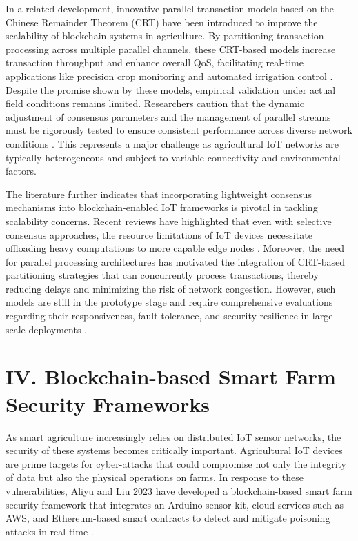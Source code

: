 \documentclass[12pt,onecolumn]{IEEEtran} %
\begin{document}
In a related development, innovative parallel transaction models based on the Chinese Remainder Theorem (CRT) have been introduced to improve the scalability of blockchain systems in agriculture. By partitioning transaction processing across multiple parallel channels, these CRT-based models increase transaction throughput and enhance overall QoS, facilitating real-time applications like precision crop monitoring and automated irrigation control \cite{ali2022blockchainenabledarchitecture}. Despite the promise shown by these models, empirical validation under actual field conditions remains limited. Researchers caution that the dynamic adjustment of consensus parameters and the management of parallel streams must be rigorously tested to ensure consistent performance across diverse network conditions \cite{ali2022blockchainenabledarchitecture}. This represents a major challenge as agricultural IoT networks are typically heterogeneous and subject to variable connectivity and environmental factors.

The literature further indicates that incorporating lightweight consensus mechanisms into blockchain-enabled IoT frameworks is pivotal in tackling scalability concerns. Recent reviews have highlighted that even with selective consensus approaches, the resource limitations of IoT devices necessitate offloading heavy computations to more capable edge nodes \cite{ali2022blockchainenabledarchitecture}. Moreover, the need for parallel processing architectures has motivated the integration of CRT-based partitioning strategies that can concurrently process transactions, thereby reducing delays and minimizing the risk of network congestion. However, such models are still in the prototype stage and require comprehensive evaluations regarding their responsiveness, fault tolerance, and security resilience in large-scale deployments \cite{ali2022blockchainenabledarchitecture}.

\section*{IV. Blockchain-based Smart Farm Security Frameworks}

As smart agriculture increasingly relies on distributed IoT sensor networks, the security of these systems becomes critically important. Agricultural IoT devices are prime targets for cyber-attacks that could compromise not only the integrity of data but also the physical operations on farms. In response to these vulnerabilities, Aliyu and Liu 2023 have developed a blockchain-based smart farm security framework that integrates an Arduino sensor kit, cloud services such as AWS, and Ethereum-based smart contracts to detect and mitigate poisoning attacks in real time \cite{aliyu2023blockchainbasedsmartfarm}.
\end{document}
